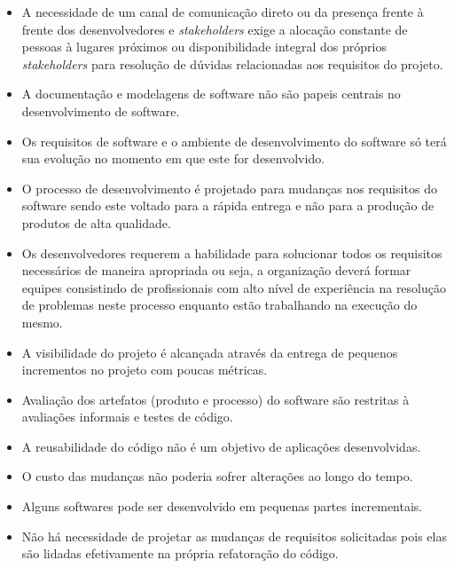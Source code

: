 \begin{itemize}
    \item A necessidade de um canal de comunicação direto ou da presença frente à frente dos desenvolvedores e \textit{stakeholders} exige 
    a alocação constante de pessoas à lugares próximos ou disponibilidade integral dos próprios \textit{stakeholders} para resolução de dúvidas relacionadas aos requisitos do projeto.
    
    \item A documentação e modelagens de software não são papeis centrais no desenvolvimento de software.
    
    \item Os requisitos de software e o ambiente de desenvolvimento do software só terá sua evolução no momento em que este for desenvolvido.
    
    \item O processo de desenvolvimento é projetado para mudanças nos requisitos do software sendo este voltado para a rápida entrega e não para a produção de produtos de alta qualidade.
    
    \item Os desenvolvedores requerem a habilidade para solucionar todos os requisitos necessários de maneira apropriada ou seja, a organização deverá formar equipes consistindo de profissionais com alto nível de experiência na resolução de problemas neste processo enquanto estão trabalhando na execução do mesmo.
    
    \item A visibilidade do projeto é alcançada através da entrega de pequenos incrementos no projeto com poucas métricas.
    
    \item Avaliação dos artefatos (produto e processo) do software são restritas à avaliações informais e testes de código.
    
    \item A reusabilidade do código não é um objetivo de aplicações desenvolvidas.
    
    \item O custo das mudanças não poderia sofrer alterações ao longo do tempo.
    
    \item Alguns softwares pode ser desenvolvido em pequenas partes incrementais.
    
    \item Não há necessidade de projetar as mudanças de requisitos solicitadas pois elas são lidadas efetivamente na própria refatoração do código.
    
\end{itemize}

